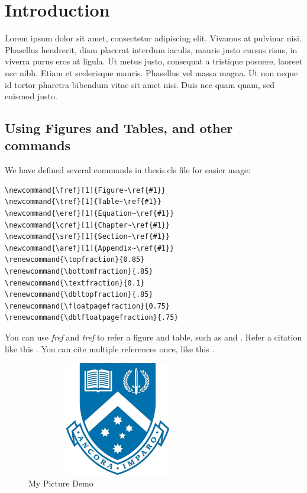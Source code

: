 \chapter{Introduction}

Lorem ipsum dolor sit amet, consectetur adipiscing elit. Vivamus at pulvinar nisi. Phasellus hendrerit, diam placerat interdum iaculis, mauris justo cursus risus, in viverra purus eros at ligula. Ut metus justo, consequat a tristique posuere, laoreet nec nibh. Etiam et scelerisque mauris. Phasellus vel massa magna. Ut non neque id tortor pharetra bibendum vitae sit amet nisi. Duis nec quam quam, sed euismod justo. 


\section{Using Figures and Tables, and other commands}

We have defined several commands in thesis.cls file for easier usage:
\begin{verbatim}
\newcommand{\fref}[1]{Figure~\ref{#1}}
\newcommand{\tref}[1]{Table~\ref{#1}}
\newcommand{\eref}[1]{Equation~\ref{#1}}
\newcommand{\cref}[1]{Chapter~\ref{#1}}
\newcommand{\sref}[1]{Section~\ref{#1}}
\newcommand{\aref}[1]{Appendix~\ref{#1}}
\renewcommand{\topfraction}{0.85}
\renewcommand{\bottomfraction}{.85}
\renewcommand{\textfraction}{0.1}
\renewcommand{\dbltopfraction}{.85}
\renewcommand{\floatpagefraction}{0.75}
\renewcommand{\dblfloatpagefraction}{.75}
\end{verbatim}

You can use \textit{fref} and \textit{tref} to refer a figure and table, such as  and . Refer a citation like this \cite{Reference1}. You can cite multiple references once, like this \cite{Reference1,Reference2,Reference3}.



\begin{figure}
\centering
  \includegraphics[width=8cm,height=5cm]{Figures/crest.jpg}%
  \caption{My Picture Demo\label{fig.demo1}}
\end{figure}

